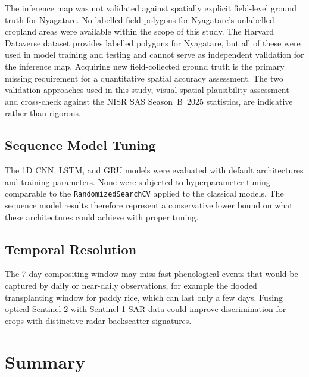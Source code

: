The inference map was not validated against spatially explicit
field-level ground truth for Nyagatare. No labelled field
polygons for Nyagatare's unlabelled cropland areas were available
within the scope of this study. The Harvard Dataverse dataset
provides labelled polygons for Nyagatare, but all of these were
used in model training and testing and cannot serve as independent
validation for the inference map. Acquiring new field-collected
ground truth is the primary missing requirement for a quantitative spatial
accuracy assessment. The two validation approaches used in this
study, visual spatial plausibility assessment and cross-check
against the NISR SAS Season~B~2025 statistics, are indicative
rather than rigorous.


\subsection*{Sequence Model Tuning}

The 1D CNN, LSTM, and GRU models were evaluated with default
architectures and training parameters. None were subjected to
hyperparameter tuning comparable to the
\texttt{RandomizedSearchCV} applied to the classical models.
The sequence model results therefore represent a conservative
lower bound on what these architectures could achieve with
proper tuning.


\subsection*{Temporal Resolution}

The 7-day compositing window may miss fast phenological events
that would be captured by daily or near-daily observations, for
example the flooded transplanting window for paddy rice, which
can last only a few days. Fusing optical Sentinel-2
with Sentinel-1 SAR data could improve discrimination for crops
with distinctive radar backscatter signatures.


\section{Summary}
\label{sec:discussion-summary}

